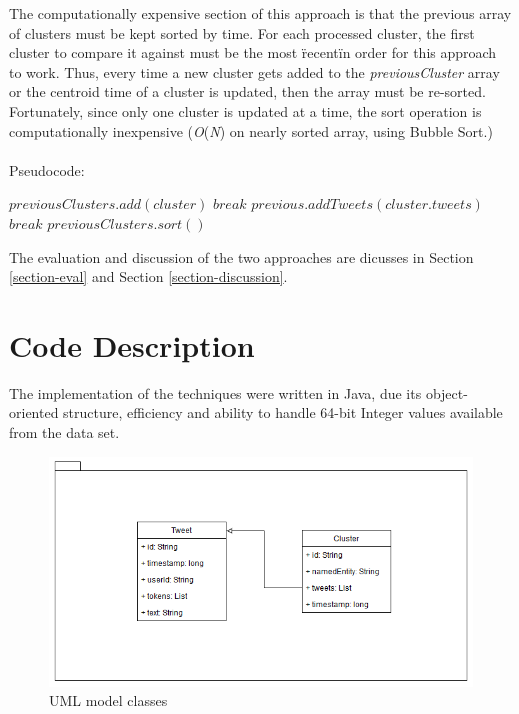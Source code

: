 \documentclass[a4paper,portrait,12pt]{article}
\begin{document}
\begin{enumerate}
	      The computationally expensive section of this approach is that the previous array of clusters must be kept sorted by time.
	      For each processed cluster, the first cluster to compare it against must be the most \"recent\" in order for this approach to work.
	      Thus, every time a new cluster gets added to the \textit{previousCluster} array or the centroid time of a cluster is updated, then the array must be re-sorted.\\
	      Fortunately, since only one cluster is updated at a time, the sort operation is computationally inexpensive (\textit{O}(\textit{N}) on nearly sorted array, using Bubble Sort.)
	      \\\\
	      Pseudocode:
	      \begin{algorithmic}
		      \State $previousClusters.add(cluster)$
		      \State $break$
		      \EndIf
		      \State $previous.addTweets(cluster.tweets)$
		      \State $break$
		      \EndIf
		      \EndFor
		      \State $previousClusters.sort()$
		      \EndFor
	      \end{algorithmic}
\end{enumerate}

The evaluation and discussion of the two approaches are dicusses in Section \ref{section-eval} and Section \ref{section-discussion}.

\section{Code Description}
The implementation of the techniques were written in Java, due its object-oriented structure, efficiency and ability to handle 64-bit Integer values available from the data set.

\begin{figure}[h!]
	\centering
	\includegraphics[width=0.5\linewidth]{images/modelUML.png}
	\caption{UML model classes}
	\label{fig:modelUML}
\end{figure}
\end{document}
